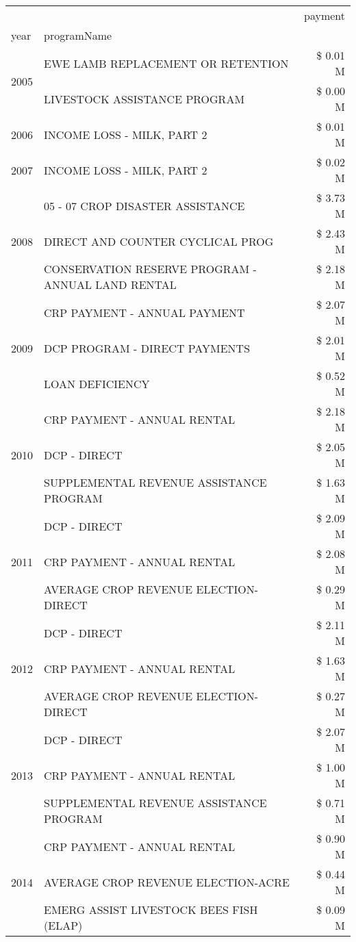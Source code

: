 \begin{tabular}{llr}
\toprule
 &  & payment \\
year & programName &  \\
\midrule
\multirow[t]{2}{*}{2005} & EWE LAMB REPLACEMENT OR RETENTION & \$ 0.01 M \\
 & LIVESTOCK ASSISTANCE PROGRAM & \$ 0.00 M \\
\cline{1-3}
2006 & INCOME LOSS - MILK, PART 2 & \$ 0.01 M \\
\cline{1-3}
2007 & INCOME LOSS - MILK, PART 2 & \$ 0.02 M \\
\cline{1-3}
\multirow[t]{3}{*}{2008} & 05 - 07 CROP DISASTER ASSISTANCE & \$ 3.73 M \\
 & DIRECT AND COUNTER CYCLICAL PROG & \$ 2.43 M \\
 & CONSERVATION RESERVE PROGRAM - ANNUAL LAND RENTAL & \$ 2.18 M \\
\cline{1-3}
\multirow[t]{3}{*}{2009} & CRP PAYMENT - ANNUAL PAYMENT & \$ 2.07 M \\
 & DCP PROGRAM - DIRECT PAYMENTS & \$ 2.01 M \\
 & LOAN DEFICIENCY & \$ 0.52 M \\
\cline{1-3}
\multirow[t]{3}{*}{2010} & CRP PAYMENT - ANNUAL RENTAL & \$ 2.18 M \\
 & DCP - DIRECT & \$ 2.05 M \\
 & SUPPLEMENTAL REVENUE ASSISTANCE PROGRAM & \$ 1.63 M \\
\cline{1-3}
\multirow[t]{3}{*}{2011} & DCP - DIRECT & \$ 2.09 M \\
 & CRP PAYMENT - ANNUAL RENTAL & \$ 2.08 M \\
 & AVERAGE CROP REVENUE ELECTION-DIRECT & \$ 0.29 M \\
\cline{1-3}
\multirow[t]{3}{*}{2012} & DCP - DIRECT & \$ 2.11 M \\
 & CRP PAYMENT - ANNUAL RENTAL & \$ 1.63 M \\
 & AVERAGE CROP REVENUE ELECTION-DIRECT & \$ 0.27 M \\
\cline{1-3}
\multirow[t]{3}{*}{2013} & DCP - DIRECT & \$ 2.07 M \\
 & CRP PAYMENT - ANNUAL RENTAL & \$ 1.00 M \\
 & SUPPLEMENTAL REVENUE ASSISTANCE PROGRAM & \$ 0.71 M \\
\cline{1-3}
\multirow[t]{3}{*}{2014} & CRP PAYMENT - ANNUAL RENTAL & \$ 0.90 M \\
 & AVERAGE CROP REVENUE ELECTION-ACRE & \$ 0.44 M \\
 & EMERG ASSIST LIVESTOCK BEES FISH (ELAP) & \$ 0.09 M \\

\end{tabular}
